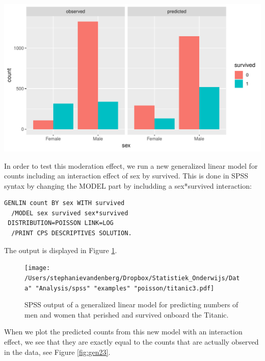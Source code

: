 \documentclass[]{report}\usepackage[]{graphicx}\usepackage[]{color}
\makeatletter
\def\maxwidth{ %
  \ifdim\Gin@nat@width>\linewidth
    \linewidth
  \else
    \Gin@nat@width
  \fi
}
\makeatother
\begin{document}
{\centering \includegraphics[width=\maxwidth]{figure/gen_22-1} 

}





In order to test this moderation effect, we run a new generalized linear model for counts including an interaction effect of sex by survived. This is done in SPSS syntax by changing the MODEL part by includding a sex*survived interaction:


\begin{verbatim}
GENLIN count BY sex WITH survived
  /MODEL sex survived sex*survived
 DISTRIBUTION=POISSON LINK=LOG
  /PRINT CPS DESCRIPTIVES SOLUTION.
\end{verbatim}


The output is displayed in Figure \ref{fig:titanic3}.


\begin{figure}[h]
    \begin{center}
       \texttt{[image: /Users/stephanievandenberg/Dropbox/Statistiek\_Onderwijs/Data" "Analysis/spss" "examples" "poisson/titanic3.pdf]}
    \end{center}
     \caption{SPSS output of a generalized linear model for predicting numbers of men and women that perished and survived onboard the Titanic.}
    \label{fig:titanic3}
\end{figure}



When we plot the predicted counts from this new model with an interaction effect, we see that they are exactly equal to the counts that are actually observed in the data, see Figure \ref{fig:gen23}.
\end{document}
